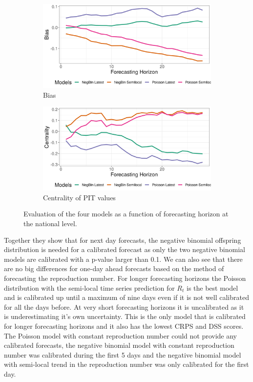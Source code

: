 \documentclass[12pt]{article}
\begin{document}
\begin{figure}[h!]
\begin{subfigure}{0.5\textwidth}
  \centering
  \includegraphics[width=\linewidth]{../output/national_bias.png}  
  \caption{Bias}
  \label{fig:sub-third}
\end{subfigure}
\begin{subfigure}{0.5\textwidth}
  \centering
  \includegraphics[width=\linewidth]{../output/national_centrality.png}  
  \caption{Centrality of PIT values}
  \label{fig:nat_scores_4}
\end{subfigure}
  \caption{Evaluation of the four models as a function of forecasting horizon at the national level.}

  \label{fig:national_scores}
\end{figure}

Together they show that for next day forecasts, the negative binomial offspring distribution is needed for a calibrated forecast as only the two negative binomial models are calibrated with a p-value larger than 0.1. We can also see that there are no big differences for one-day ahead forecasts based on the method of forecasting the reproduction number. For longer forecasting horizons the Poisson distribution with the semi-local time series prediction for $R_t$ is the best model and is calibrated up until a maximum of nine days even if it is not well calibrated for all the days before. At very short forecasting horizons it is uncalibrated as it is underestimating it's own uncertainty. This is the only model that is calibrated for longer forecasting horizons and it also has the lowest CRPS and DSS scores. The Poisson model with constant reproduction number could not provide any calibrated forecasts, the negative binomial model with constant reproduction number was calibrated during the first 5 days and the negative binomial model with semi-local trend in the reproduction number was only calibrated for the first day.
\end{document}
